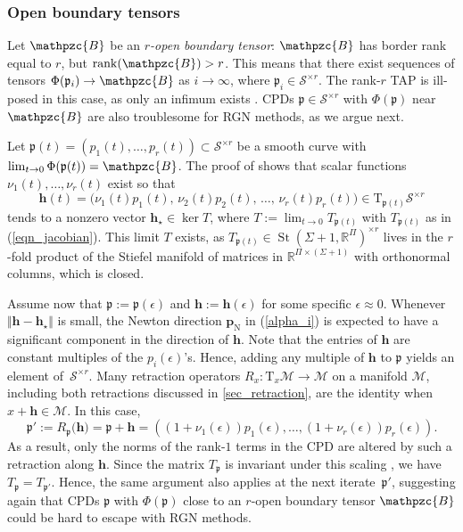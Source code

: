 \documentclass[a4paper,10pt,final]{siamart1116}
\newcommand{\tuple}[1]{\mathfrak{#1}}
\newcommand{\Var}[1]{\mathcal{#1}}
\newcommand{\tensor}[1]{\mathpzc{#1}}
\newcommand{\vect}[1]{\mathbf{#1}}
\newcommand{\Tang}[2]{\mathrm{T}_{#1} {#2}}
\newcommand{\R}{\mathbb{R}}
\newcommand{\refeqn}[1]{{(\ref{#1})}}
\newcommand{\refsec}[1]{{\cref{#1}}}
\numberwithin{equation}{section}
\numberwithin{figure}{section}
\numberwithin{table}{section}
\numberwithin{theorem}{section}
\begin{document}
\subsubsection{Open boundary tensors}
Let $\tensor{B}$ be an \emph{$r$-open boundary tensor}: $\tensor{B}$ has border rank \cite[section 2.4]{Landsberg2012} equal to $r$, but $\mathrm{rank}(\tensor{B})>r$. This means that there exist sequences of tensors $\Phi(\tuple{p}_i) \to \tensor{B}$ as $i \to \infty$, where $\tuple{p}_i \in \Var{S}^{\times r}$. The rank-$r$ TAP is ill-posed in this case, as only an infimum exists \cite{dSL2008}. CPDs $\tuple{p} \in\Var{S}^{\times r}$ with $\Phi(\tuple{p})$ near $\tensor{B}$ are also troublesome for RGN methods, as we argue next.

Let $\tuple{p}(t)=(p_1(t), \ldots, p_r(t)) \subset \Var S^{\times r}$ be a smooth curve with $\lim_{t\to0} \Phi(\tuple{p}(t)) = \tensor{B}$. The proof of \cite[theorem 1.4]{BV2017} shows that scalar functions $\nu_1(t),\ldots,\nu_r(t)$ exist so that
\[
 \vect{h}(t) =  \bigl( \nu_1(t) p_1(t),\, \nu_2(t) p_2(t),\, \ldots,\, \nu_r(t) p_r(t) \bigr) \in \Tang{\tuple{p}(t)}{\Var S^{\times r}}
\]
tends to a nonzero vector $\vect{h}_\star\in\ker T$, where $T := \lim_{t\to0} T_{\tuple{p}(t)}$ with $T_{\tuple{p}(t)}$ as in \refeqn{eqn_jacobian}. This limit $T$ exists, as
\(
 T_{\tuple{p}(t)} \in \operatorname{St}(\Sigma+1, \R^\Pi)^{\times r}
\)
lives in the $r$-fold product of the Stiefel manifold of matrices in $\R^{\Pi \times (\Sigma+1)}$ with orthonormal columns, which is closed.

Assume now that $\tuple{p} := \tuple{p}(\epsilon)$ and $\vect{h}:=\vect{h}(\epsilon)$ for some specific $\epsilon \approx 0$. Whenever $\Vert\vect{h}- \vect{h}_\star\Vert$ is small, the Newton direction $\vect{p}_{\mathrm{N}}$ in \refeqn{alpha_i} is expected to have a significant component in the direction of $\vect{h}$. Note that the entries of $\vect{h}$ are constant multiples of the $p_i(\epsilon)$'s. Hence, adding any multiple of $\vect{h}$ to $\tuple{p}$ yields an element of~$\Var{S}^{\times r}$. Many retraction operators $R_x : \Tang{x}{\Var{M}} \to \Var{M}$ on a manifold $\Var{M}$, including both retractions discussed in \refsec{sec_retraction}, are the identity when $x + \vect{h} \in \Var{M}$. In this case,
\[
\tuple{p}' :=
R_{\tuple{p}}\bigl(\vect{h} \bigr) =\tuple{p} +  \vect{h} = ((1+\nu_1(\epsilon))p_1(\epsilon), \ldots, (1+\nu_r(\epsilon))p_r(\epsilon)).
\]
As a result, only the norms of the rank-$1$ terms in the CPD are altered by such a retraction along $\vect{h}$.
Since the matrix $T_{\tuple{p}}$ is invariant under this scaling \cite[Proposition~4.4]{BV2017}, we have
\(
 T_{\tuple{p}} = T_{\tuple{p}'}.
\)
Hence, the same argument also applies at the next iterate~$\tuple{p}'$, suggesting again that CPDs $\tuple{p}$ with $\Phi(\tuple{p})$ close to an $r$-open boundary tensor $\tensor{B}$ could be hard to escape with RGN methods.
\end{document}
